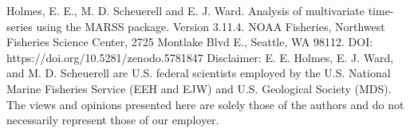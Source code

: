 

\thispagestyle{empty}
\vspace*{14cm}
\vfil
\begin{flushleft}

Holmes, E. E., M. D. Scheuerell and E. J. Ward. Analysis of multivariate time-series using the MARSS package. Version 3.11.4. NOAA Fisheries, Northwest Fisheries Science Center, 2725 Montlake Blvd E., Seattle, WA 98112. DOI: https://doi.org/10.5281/zenodo.5781847
\newline
\newline
Disclaimer: E. E. Holmes, E. J. Ward, and M. D. Scheuerell are U.S. federal scientists employed by the U.S. National Marine Fisheries Service (EEH and EJW) and U.S. Geological Society (MDS).  The views and opinions presented here are solely those of the authors and do not necessarily represent those of our employer.

\end{flushleft}

